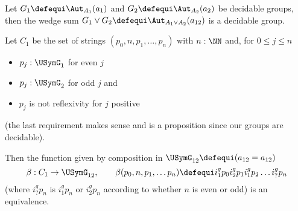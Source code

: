 \begin{lemma}
  \label{lem:wedgeofgpoidisgpoid}
  Let $G_1\defequi\Aut_{A_1}(a_1)$ and $G_2\defequi\Aut_{A_2}(a_2)$ be decidable groups, then the wedge sum $G_1\vee G_2\defequi\Aut_{A_1\vee A_2}(a_{12})$ is a decidable group.

Let $C_1$ be the set of strings $(p_0,n,p_1,\dots,p_n)$ with $n:\NN$ and, for $0\leq j\leq n$
\begin{itemize}
\item $p_{j}:\USymG_1%
  $  for even $j$
\item $p_{j}:\USymG_2%
  $ for odd $j$ and
\item $p_j$ is not reflexivity for $j$ positive
\end{itemize}
(the last requirement makes sense and is a proposition since our groups are decidable).

  Then the function given by composition in $\USymG_{12}\defequi(a_{12}=a_{12})$
  $$\beta:C_1\to\USymG_{12}%
  ,\qquad\beta(p_0,n,p_1,\dots p_n)\defequi i_1^gp_0i_2^gp_1i_1^gp_2\dots i_?^gp_n$$
(where $i_?^gp_n$  is $i_1^gp_n$ or $i_2^gp_n$ according to whether $n$ is even or odd) is an equivalence.
\end{lemma}
